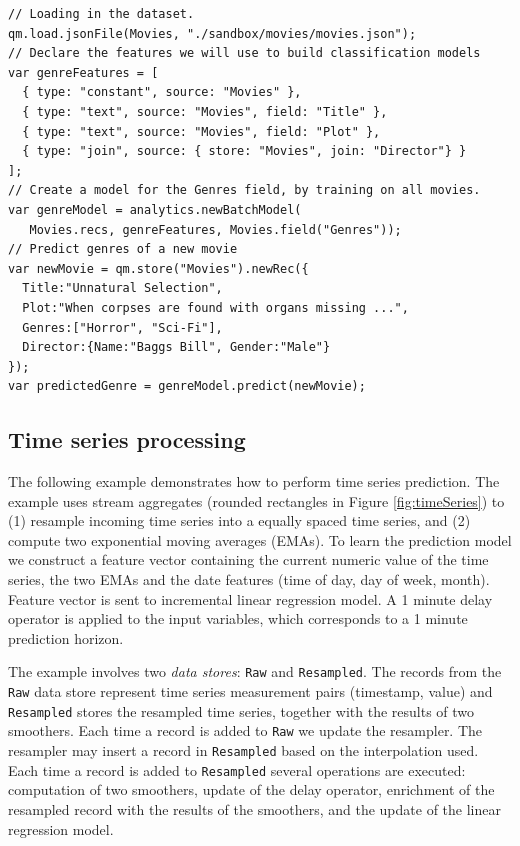 \documentclass{article} %
\begin{document}
\begin{lstlisting}[caption={Text mining: storage, feature extraction and classification.}] 	
// Loading in the dataset.
qm.load.jsonFile(Movies, "./sandbox/movies/movies.json");
// Declare the features we will use to build classification models
var genreFeatures = [
  { type: "constant", source: "Movies" },
  { type: "text", source: "Movies", field: "Title" },
  { type: "text", source: "Movies", field: "Plot" },
  { type: "join", source: { store: "Movies", join: "Director"} }
];
// Create a model for the Genres field, by training on all movies.
var genreModel = analytics.newBatchModel(
   Movies.recs, genreFeatures, Movies.field("Genres"));
// Predict genres of a new movie
var newMovie = qm.store("Movies").newRec({
  Title:"Unnatural Selection",
  Plot:"When corpses are found with organs missing ...",
  Genres:["Horror", "Sci-Fi"],
  Director:{Name:"Baggs Bill", Gender:"Male"}
});
var predictedGenre = genreModel.predict(newMovie);
\end{lstlisting}

\subsection{Time series processing}

The following example demonstrates how to perform time series prediction. The example uses stream aggregates (rounded rectangles in Figure \ref{fig:timeSeries}) to (1) resample incoming time series into a equally spaced time series, and (2) compute two exponential moving averages (EMAs). To learn the prediction model we construct a feature vector containing the current numeric value of the time series, the two EMAs and the date features (time of day, day of week, month). Feature vector is sent to incremental linear regression model. A 1 minute delay operator is applied to the input variables, which corresponds to a 1 minute prediction horizon.

The example involves two \emph{data stores}: \texttt{Raw} and \texttt{Resampled}. The records from the \texttt{Raw} data store represent time series measurement pairs (timestamp, value) and \texttt{Resampled} stores the resampled time series, together with the results of two smoothers. Each time a record is added to \texttt{Raw} we update the resampler. The resampler may insert a record in
\texttt{Resampled} based on the interpolation used. Each time a record is added to \texttt{Resampled} several operations are executed: computation of two smoothers, update of the delay operator, enrichment of the resampled record with the results of the smoothers, and the update of the linear regression model.
\end{document}
